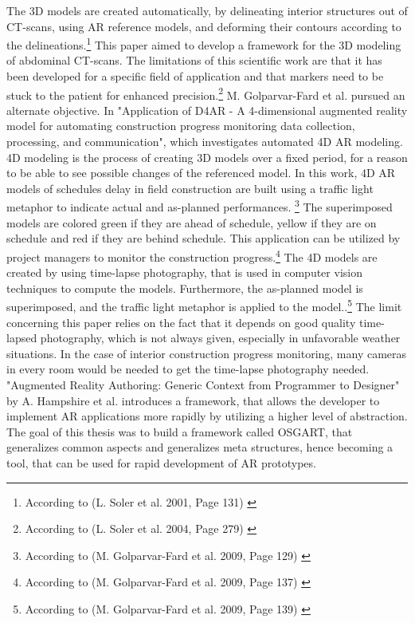 \documentclass[12pt,a4paper,oneside,american,parskip=half]{article}
\begin{document}
\begin{justify}
\begin{normalsize}
The 3D models are created automatically, by delineating interior structures out of CT-scans, using AR reference models, and deforming their contours according to the delineations.\footnote{According to (L. Soler et al. 2001, Page 131) \cite{digestiv2}}
\newline
This paper aimed to develop a framework for the 3D modeling of abdominal CT-scans. The limitations of this scientific work are that it has been developed for a specific field of application and that markers need to be stuck to the patient for enhanced precision.\footnote{According to (L. Soler et al. 2004, Page 279) \cite{digestiv}}
\newline
\newline
M. Golparvar-Fard et al. pursued an alternate objective. In "Application of D4AR - A 4-dimensional augmented reality model for automating construction progress monitoring data collection, processing, and communication", which investigates automated 4D AR modeling.
4D modeling is the process of creating 3D models over a fixed period, for a reason to be able to see possible changes of the referenced model.
In this work, 4D AR models of schedules delay in field construction are built using a traffic light metaphor to indicate actual and as-planned performances. \footnote{According to (M. Golparvar-Fard et al. 2009, Page 129) \cite{4D}}
The superimposed models are colored green if they are ahead of schedule, yellow if they are on schedule and red if they are behind schedule. This application can be utilized by project managers to monitor the construction progress.\footnote{According to (M. Golparvar-Fard et al. 2009, Page 137) \cite{4D}}
The 4D models are created by using time-lapse photography, that is used in computer vision techniques to compute the models. Furthermore, the as-planned model is superimposed, and the traffic light metaphor is applied to the model..\footnote{According to (M. Golparvar-Fard et al. 2009, Page 139) \cite{4D}}
\newline
\newline
The limit concerning this paper relies on the fact that it depends on good quality time-lapsed photography, which is not always given, especially in unfavorable weather situations. In the case of interior construction progress monitoring, many cameras in every room would be needed to get the time-lapse photography needed.
\newline
\newline
"Augmented Reality Authoring: Generic Context from Programmer to Designer" by  A. Hampshire et al. introduces a framework, that allows the developer to implement AR applications more rapidly by utilizing a higher level of abstraction. The goal of this thesis was to build a framework called OSGART, that generalizes common aspects and generalizes meta structures, hence becoming a tool, that can be used for rapid development of AR prototypes.

\end{normalsize}
\end{justify}
\end{document}
